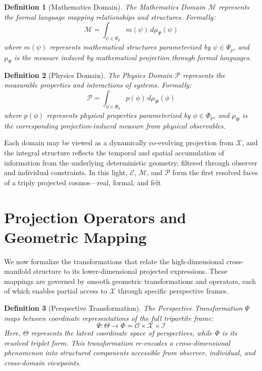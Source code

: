 \documentclass{article}
\newtheorem{definition}{Definition}
\begin{document}
\begin{definition}[Mathematics Domain]
The Mathematics Domain $\mathcal{M}$ represents the formal language mapping relationships and structures. Formally:
\begin{equation}
\mathcal{M} = \int_{\psi \in \Psi_p} m(\psi) \, d\mu_\Psi(\psi)
\end{equation}
where $m(\psi)$ represents mathematical structures parameterized by $\psi \in \Psi_p$, and $\mu_\Psi$ is the measure induced by mathematical projection through formal languages.
\end{definition}

\begin{definition}[Physics Domain]
The Physics Domain $\mathcal{P}$ represents the measurable properties and interactions of systems. Formally:
\begin{equation}
\mathcal{P} = \int_{\phi \in \Phi_p} p(\phi) \, d\mu_\Phi(\phi)
\end{equation}
where $p(\phi)$ represents physical properties parameterized by $\phi \in \Phi_p$, and $\mu_\Phi$ is the corresponding projection-induced measure from physical observables.
\end{definition}

Each domain may be viewed as a dynamically co-evolving projection from $\mathcal{X}$, and the integral structure reflects the temporal and spatial accumulation of information from the underlying deterministic geometry, filtered through observer and individual constraints. In this light, $\mathcal{E}$, $\mathcal{M}$, and $\mathcal{P}$ form the first resolved faces of a triply projected cosmos—real, formal, and felt




\section{Projection Operators and Geometric Mapping}

We now formalize the transformations that relate the high-dimensional cross-manifold structure to its lower-dimensional projected expressions. These mappings are governed by smooth geometric transformations and operators, each of which enables partial access to $\mathcal{X}$ through specific perspective frames.

\begin{definition}[Perspective Transformation]
The Perspective Transformation $\Psi$ maps between coordinate representations of the full tripartite frame:
\begin{equation}
\Psi: \Theta \to \Phi = \mathcal{O} \times \mathcal{X} \times \mathcal{I}
\end{equation}
Here, $\Theta$ represents the latent coordinate space of perspectives, while $\Phi$ is its resolved triplet form. This transformation re-encodes a cross-dimensional phenomenon into structured components accessible from observer, individual, and cross-domain viewpoints.
\end{definition}
\end{document}
